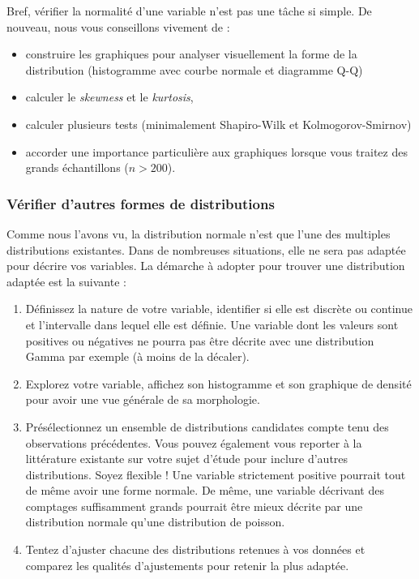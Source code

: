 \documentclass[
  11pt,
  french,
]{book}
\makeatletter
\providecommand{\tightlist}{%
  \setlength{\itemsep}{0pt}\setlength{\parskip}{0pt}}
\newenvironment{kframev}{%
\medskip{}
\setlength{\fboxsep}{.8em}
 \def\at@end@of@kframev{}%
 \ifinner\ifhmode%
  \def\at@end@of@kframev{\end{minipage}}%
  \begin{minipage}{\columnwidth}%
 \fi\fi%
 \def\FrameCommand##1{\hskip\@totalleftmargin \hskip-\fboxsep
 \colorbox{shadebluecolor}{##1}\hskip-\fboxsep
     \hskip-\linewidth \hskip-\@totalleftmargin \hskip\columnwidth}%
 \MakeFramed {\advance\hsize-\width
   \@totalleftmargin\z@ \linewidth\hsize
   \@setminipage}}%
 {\par\unskip\endMakeFramed%
 \at@end@of@kframev}
\newenvironment{rmdblock}[1]
  {
  \begin{itemize}
  \renewcommand{\labelitemi}{
    \raisebox{-.7\height}[0pt][0pt]{
      {\setkeys{Gin}{width=3em,keepaspectratio}\texttt{[image: images/\#1]}}
    }
  }
  \setlength{\fboxsep}{1em}
  \begin{kframev}
  \small
  \item
  }
  {
  \end{kframev}
  \end{itemize}
  }
\newenvironment{bloc_astuce}
  {\begin{rmdblock}{astuce}}
  {\end{rmdblock}}
\makeatother
\begin{document}
\begin{bloc_astuce}

Bref, vérifier la normalité d'une variable n'est pas une tâche si simple. De nouveau, nous vous conseillons vivement de :

\begin{itemize}
\tightlist
\item
  construire les graphiques pour analyser visuellement la forme de la distribution (histogramme avec courbe normale et diagramme Q-Q)
\item
  calculer le \emph{skewness} et le \emph{kurtosis},
\item
  calculer plusieurs tests (minimalement Shapiro-Wilk et Kolmogorov-Smirnov)
\item
  accorder une importance particulière aux graphiques lorsque vous traitez des grands échantillons (\(n>200\)).
\end{itemize}


\end{bloc_astuce}

\hypertarget{sect02adjdistrib}{%
\subsubsection{Vérifier d'autres formes de distributions}\label{sect02adjdistrib}}

Comme nous l'avons vu, la distribution normale n'est que l'une des multiples distributions existantes. Dans de nombreuses situations, elle ne sera pas adaptée pour décrire vos variables. La démarche à adopter pour trouver une distribution adaptée est la suivante :

\begin{enumerate}
\def\labelenumi{\arabic{enumi}.}
\tightlist
\item
  Définissez la nature de votre variable, identifier si elle est discrète ou continue et l'intervalle dans lequel elle est définie. Une variable dont les valeurs sont positives ou négatives ne pourra pas être décrite avec une distribution Gamma par exemple (à moins de la décaler).
\item
  Explorez votre variable, affichez son histogramme et son graphique de densité pour avoir une vue générale de sa morphologie.
\item
  Présélectionnez un ensemble de distributions candidates compte tenu des observations précédentes. Vous pouvez également vous reporter à la littérature existante sur votre sujet d'étude pour inclure d'autres distributions. Soyez flexible ! Une variable strictement positive pourrait tout de même avoir une forme normale. De même, une variable décrivant des comptages suffisamment grands pourrait être mieux décrite par une distribution normale qu'une distribution de poisson.
\item
  Tentez d'ajuster chacune des distributions retenues à vos données et comparez les qualités d'ajustements pour retenir la plus adaptée.
\end{enumerate}
\end{document}
